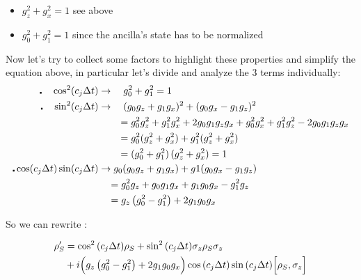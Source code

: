 \documentclass[a4paper,12pt]{article}
\begin{document}
	\begin{itemize}
		\item $ g_{z}^{2} + g_{x}^{2} = 1 $ see above
		\item $ g_{0}^{2} + g_{1}^{2} = 1 $ since the ancilla's state has to be normalized
	\end{itemize}
	Now let's try to collect some factors to highlight these properties and simplify the equation above, in particular let's divide and analyze the 3 terms individually:
	\begin{align}
		\centerdot \quad \cos^{2}(c_j \Delta t) &\rightarrow \quad g_{0}^{2} + g_{1}^{2} = 1 \notag \\
		\centerdot \quad \sin^{2}(c_j \Delta t) &\rightarrow \quad (g_0 g_z + g_1 g_x)^{2} + (g_0 g_x - g_1 g_z)^{2} \notag \\
		&\qquad = g_{0}^{2}g_{z}^{2} + g_{1}^{2}g_{x}^{2} + {2 g_{0} g_{1} g_{z} g_{x}} + g_{0}^{2} g_{x}^{2} + g_{1}^{2} g_{z}^{2} - {2 g_{0} g_{1} g_{z} g_{x}} \notag \\
		&\qquad = g_{0}^{2} (g_{z}^{2} + g_{x}^{2}) + g_{1}^{2} (g_{z}^{2} + g_{x}^{2}) \notag \\
		&\qquad = (g_{0}^{2} + g_{1}^{2}) \, (g_{z}^{2} + g_{x}^{2}) = 1 \notag \\
		\centerdot \cos(c_j \Delta t)\sin(c_j \Delta t) &\rightarrow g_{0} (g_0 g_z + g_1 g_x) + g1 (g_0 g_x - g_1 g_z) \notag \\
		& \quad = g_{0}^{2} g_z + g_{0} g_{1} g_{x} + g_{1} g_{0} g_{x} - g_{1}^{2} g_z \notag \\
		& \quad = g_{z}\left(g_{0}^{2} - g_{1}^{2} \right) + 2 g_{1} g_{0} g_{x} \notag
	\end{align}

	So we can rewrite :

	\begin{align}
		\rho_S' &= \cos^{2}{\left(c_j \Delta t \right)} \rho_S + \sin^{2}{\left(c_j \Delta t \right)} \sigma_{z} \rho_S \sigma_{z} \notag \\
		&+ i \Big( g_{z}\left(g_{0}^{2} - g_{1}^{2} \right) + 2 g_{1} g_{0} g_{x} \Big) \cos{\left(c_j \Delta t \right)} \sin{\left(c_j \Delta t \right)} \Big[\rho_S , \sigma_{z} \Big]
		\label{eq:comp_rho_int}
	\end{align}
\end{document}
